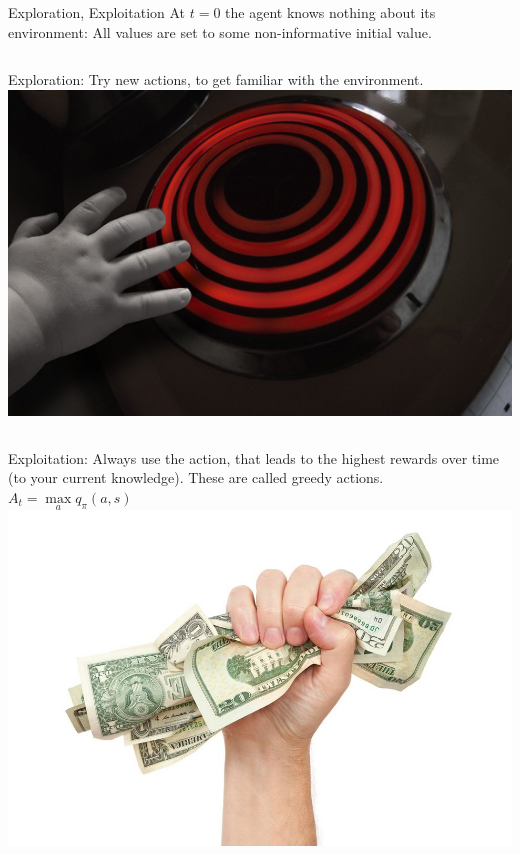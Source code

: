 \documentclass{beamer}
\begin{document}
\begin{frame}{Exploration, Exploitation}
	At $t = 0$ the agent knows nothing about its environment: All values are set to some non-informative initial value. \\[\baselineskip]
	\begin{columns}
		Exploration: Try new actions, to get familiar with the environment. 
		\includegraphics[width=0.8\linewidth]{Images/hot-stove.jpg}
	\end{columns}
	\begin{columns}
	\column{0.5\textwidth}
		Exploitation: Always use the action, that leads to the highest rewards over time (to your current knowledge). These are called greedy actions.\\
		$A_t = \max\limits_{a} q_{\pi}(a,s)$
	\column{0.5\textwidth}
		\includegraphics[width=0.8\linewidth]{Images/cash.jpg}
	\end{columns}
\end{frame}

\end{document}
